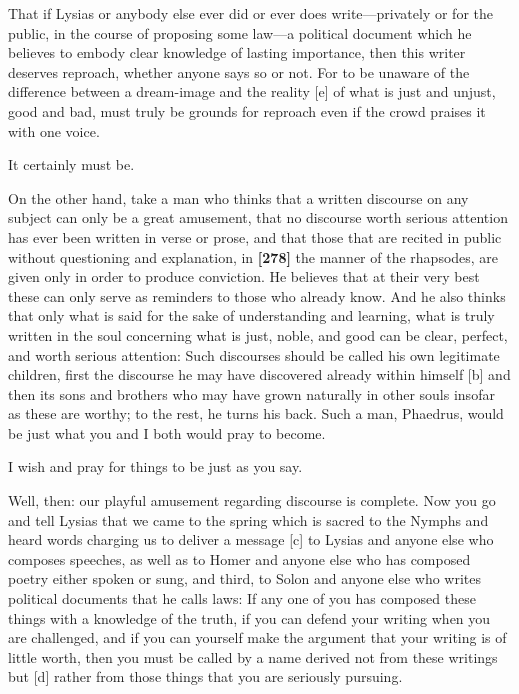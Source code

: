 \saysocrates That if Lysias or anybody else ever did or ever does
write---privately or for the public, in the course of proposing some
law---a political document which he believes to embody clear knowledge
of lasting importance, then this writer deserves reproach, whether
anyone says so or not. For to be unaware of the difference between a
dream-image and the reality {[}e{]} of what is just and unjust, good and
bad, must truly be grounds for reproach even if the crowd praises it
with one voice.

\sayphaedrus It certainly must be.

\saysocrates On the other hand, take a man who thinks that a written
discourse on any subject can only be a great amusement, that no
discourse worth serious attention has ever been written in verse or
prose, and that those that are recited in public without questioning and
explanation, in {\bf {[}278{]}} the manner of the rhapsodes, are given
only in order to produce conviction. He believes that at their very best
these can only serve as reminders to those who already know. And he also
thinks that only what is said for the sake of understanding and
learning, what is truly written in the soul concerning what is just,
noble, and good can be clear, perfect, and worth serious attention: Such
discourses should be called his own legitimate children, first the
discourse he may have discovered already within himself {[}b{]} and then
its sons and brothers who may have grown naturally in other souls
insofar as these are worthy; to the rest, he turns his back. Such a man,
Phaedrus, would be just what you and I both would pray to become.

\sayphaedrus I wish and pray for things to be just as you say.

\saysocrates Well, then: our playful amusement regarding discourse is
complete. Now you go and tell Lysias that we came to the spring which is
sacred to the Nymphs and heard words charging us to deliver a message
{[}c{]} to Lysias and anyone else who composes speeches, as well as to
Homer and anyone else who has composed poetry either spoken or sung, and
third, to Solon and anyone else who writes political documents that he
calls laws: If any one of you has composed these things with a knowledge
of the truth, if you can defend your writing when you are challenged,
and if you can yourself make the argument that your writing is of little
worth, then you must be called by a name derived not from these writings
but {[}d{]} rather from those things that you are seriously pursuing.

